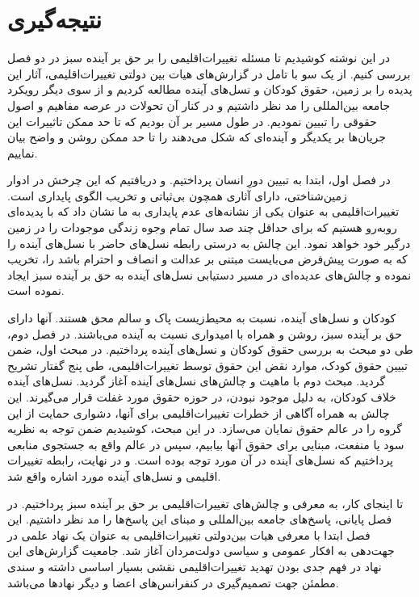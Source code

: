 \clearpage
{}
{}
\chapter*{نتیجه‌گیری}



در این نوشته کوشیدیم تا مسئله تغییرات‌اقلیمی را بر حق بر آینده سبز در دو فصل بررسی کنیم. از یک سو با تامل در گزارش‌های هیات بین دولتی تغییرات‌اقلیمی، آثار این پدیده را بر زمین، حقوق کودکان و نسل‌های آینده مطالعه کردیم و از سوی دیگر رویکرد جامعه بین‌المللی را مد نظر داشتیم و در کنار آن تحولات در عرصه مفاهیم و اصول حقوقی را تبیین نمودیم. در طول مسیر بر آن بودیم که تا حد ممکن تاثییرات این جریان‌ها بر یکدیگر و آینده‌ای که شکل می‌دهند را تا حد ممکن روشن و واضح بیان نماییم.

در فصل اول، ابتدا به تبیین دورِ انسان پرداختیم. و دریافتیم که این چرخش در ادوار زمین‌شناختی، دارای آثاری همچون بی‌ثباتی و تخریب الگوی پایداری است. تغییرات‌اقلیمی به عنوان یکی از نشانه‌های عدم پایداری  به ما نشان داد که با پدیده‌ای روبه‌رو هستیم که برای حداقل چند صد سال تمام وجوه زندگی موجودات را در زمین درگیر خود خواهد نمود. این چالش به درستی رابطه نسل‌‌های حاضر با نسل‌های آینده را که به صورت پیش‌فرض  می‌بایست مبتنی بر عدالت و انصاف و احترام باشد را، تخریب نموده و چالش‌های عدیده‌ای در مسیر دستیابی نسل‌های آینده به حق بر آینده سبز ایجاد نموده است. 

کودکان و نسل‌های آینده، نسبت به محیط‌زیست پاک و سالم محق هستند. آنها دارای حق بر آینده سبز، روشن و همراه با امیدواری نسبت به آینده می‌باشند. در فصل دوم، طی دو مبحث به بررسی حقوق کودکان و نسل‌های آینده پرداختیم. در مبحث اول، ضمن تبیین حقوق کودک، موارد نقض این حقوق توسط تغییرات‌اقلیمی، طی پنج گفتار تشریح گردید. مبحث دوم با ماهیت و چالش‌های نسل‌های آینده آغاز گردید. نسل‌های آینده خلاف کودکان، به دلیل موجود نبودن، در حوزه حقوق مورد غفلت قرار می‌گیرند. این چالش به همراه آگاهی از خطرات تغییرات‌اقلیمی برای آنها، دشواری حمایت از این گروه را در عالم حقوق نمایان می‌سازد. در این مبحث، کوشیدیم ضمن توجه به نظریه سود یا منفعت، مبنایی برای حقوق آنها بیابیم، سپس در عالم واقع به جستجوی منابعی پرداختیم که نسل‌های آینده در آن مورد توجه بوده است. و در نهایت، رابطه تغییرات اقلیمی و نسل‌های آینده مورد اشاره واقع شد. 

تا اینجای کار، به معرفی و چالش‌های تغییرات‌اقلیمی بر حق بر آینده سبز پرداختیم. در فصل پایانی، پاسخ‌های جامعه بین‌المللی و مبنای این پاسخ‌ها را مد نظر داشتیم. این فصل ابتدا با معرفی هیات بین‌دولتی تغییرات‌اقلیمی به عنوان یک نهاد علمی در جهت‌دهی به افکار عمومی و سیاسی دولت‌مردان آغاز شد. جامعیت گزارش‌های این نهاد در فهم جدی بودن تهدید تغییرات‌اقلیمی نقشی بسیار اساسی داشته و سندی مطمئن جهت تصمیم‌گیری در کنفرانس‌های اعضا و دیگر نهاد‌ها می‌باشد. 


